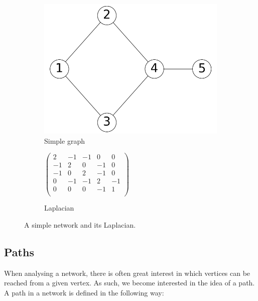 \begin{figure}
    \begin{center}
        \begin{subfigure}[b]{0.45\textwidth}
            \includegraphics[width=\textwidth]{img/simple_example}
            \caption{Simple graph}
            \label{fig:simple_network_2}
        \end{subfigure}
        \begin{subfigure}[b]{0.45\textwidth}
            \begin{center}
            $
            \begin{pmatrix}
                 2 & -1 & -1 &  0 &  0 \\
                -1 &  2 &  0 & -1 &  0 \\
                -1 &  0 &  2 & -1 &  0 \\
                 0 & -1 & -1 &  2 & -1 \\
                 0 &  0 &  0 & -1 &  1 \\
            \end{pmatrix}
            $
            \end{center}
            \caption{Laplacian}
            \label{fig:simple_network_laplacian}
        \end{subfigure}
    \end{center}
    \caption{A simple network and its Laplacian.}
    \label{fig:simple_network_and_laplacian}
\end{figure}


\subsection{Paths}
When analysing a network, there is often great interest in which vertices can be reached from a given vertex. As such, we become interested in the idea of a path. A path in a network is defined in the following way:

